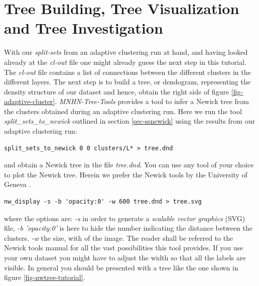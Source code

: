 \section{Tree Building, Tree Visualization and Tree Investigation}

With our \emph{split-sets} from an adaptive clustering run at hand,
and having looked already at the \emph{cl-out} file one might already
guess the next step in this tutorial. The \emph{cl-out} file contains
a list of connections between the different clusters in the different
layers. The next step is to build a tree, or dendogram,
representing the density structure of our dataset and hence, obtain the
right side of figure
\ref{fig-adaptive-cluster}. \emph{MNHN-Tree-Tools} provides
a tool to infer a Newick tree \cite{newick} from the clusters
obtained during an adaptive clustering run. Here we run the tool
\emph{split\_sets\_to\_newick} outlined in section \ref{sec-ssnewick}
using the results from our adaptive clustering run:
\begin{lstlisting}
split_sets_to_newick 0 0 clusters/L* > tree.dnd
\end{lstlisting}
and obtain a Newick tree in the file \emph{tree.dnd}. You can use any
tool of your choice to plot the Newick tree. Herein we prefer the
Newick tools by the University of Geneva
\cite{newick_tools}.
\begin{lstlisting}
nw_display -s -b 'opacity:0' -w 600 tree.dnd > tree.svg
\end{lstlisting}
where the options are: \emph{-s} in order to generate a \emph{scalable
vector graphics} (SVG) file, \emph{-b 'opacity:0'} is here to hide the
number indicating the distance between the clusters. \emph{-w} the
size, with of the image. The reader shall be referred to the Newick
tools manual for all the vast possibilities this tool provides. If you use
your own dataset you might have to adjust the width so that all the
labels are visible. In general you should be presented with a tree
like the one shown in figure \ref{fig-nwtree-tutorial}.
